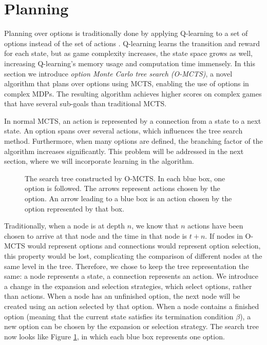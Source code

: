 \section{Planning}
\label{sec:planning}


Planning over options is traditionally done by applying Q-learning to a set of
options instead of the set of actions \cite{sutton1999between}. Q-learning
learns the transition and reward for each state, but as game complexity
increases, the state space grows as well, increasing Q-learning's memory usage
and computation time immensely. In this section we introduce \emph{option Monte
Carlo tree search (O-MCTS)}, a novel algorithm that plans over options using
MCTS, enabling the use of options in complex MDPs.  The resulting algorithm
achieves higher scores on complex games that have several sub-goals than
traditional MCTS.

In normal MCTS, an action is represented by a connection from a state to a next
state. An option spans over several actions, which influences the tree search
method. Furthermore, when many options are defined, the branching factor of the
algorithm increases significantly. This problem will be addressed in the next
section, where we will incorporate learning in the algorithm.

\begin{figure}
	\centering
	\caption{The search tree constructed by O-MCTS. In each blue box, one option
	is followed. The arrows represent actions chosen by the option. An arrow
leading to a blue box is an action chosen by the option represented by that box.}
	\label{fig:omcts-tree}
\end{figure}

Traditionally, when a node is at depth $n$, we know that $n$ actions have been
chosen to arrive at that node and the time in that node is $t+n$. If nodes in
O-MCTS would represent options and connections would represent option selection,
this property would be lost, complicating the comparison of different nodes at
the same level in the tree. Therefore, we chose to keep the tree representation
the same: a node represents a state, a connection represents an action. We
introduce a change in the expansion and selection strategies, which select
options, rather than actions. When a node has an unfinished option, the next
node will be created using an action selected by that option. When a node
contains a finished option (meaning that the current state satisfies its
termination condition $\beta$), a new option can be chosen by the expansion or
selection strategy. The search tree now looks like Figure \ref{fig:omcts-tree},
in which each blue box represents one option.

